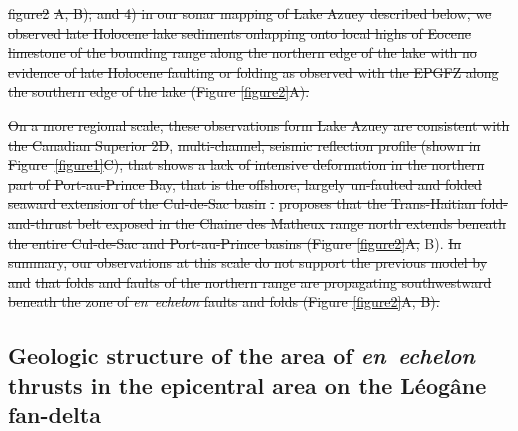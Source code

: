 \documentclass[linenumbers,draft]{agujournal}
\providecommand{\DIFadd}[1]{{\protect\color{blue}\uwave{#1}}} %
\providecommand{\DIFdel}[1]{{\protect\color{red}\sout{#1}}}                      %
\providecommand{\DIFaddbegin}{} %
\providecommand{\DIFaddend}{} %
\providecommand{\DIFdelbegin}{} %
\providecommand{\DIFdelend}{} %
\begin{document}
\DIFdel{figure2}%
\DIFdel{A, B); and 4) in our sonar mapping of Lake Azuey described below, we observed late Holocene lake sediments onlapping onto local highs of Eocene limestone of the bounding range along the northern edge of the lake with no evidence of late Holocene faulting or folding as observed with the EPGFZ along the southern edge of the lake (Figure \ref{figure2}A). 
}%

\DIFdel{On a more regional scale, these observations form Lake Azuey are consistent with the Canadian Superior 2D}\DIFdelend \DIFaddbegin \DIFadd{\ref{figure2}A}\DIFaddend , \DIFdelbegin \DIFdel{multi-channel, seismic reflection profile (shown in Figure~\ref{figure1}C), that shows a lack of intensive deformation in the northern part of Port-au-Prince Bay, that is the offshore, largely un-faulted and folded seaward extension of the Cul-de-Sac basin }%
\DIFdel{. }%
\DIFdel{proposes that the Trans-Haitian fold-and-thrust belt exposed in the Chaine des Matheux range north extends beneath the entire Cul-de-Sac and Port-au-Prince basins (Figure \ref{figure2}A, }\DIFdelend B).
\DIFdelbegin \DIFdel{In summary, our observations at this scale do not support the previous model by }%
\DIFdel{and }%
\DIFdel{that folds and faults of the northern range are propagating southwestward beneath the zone of \textit{en~echelon} faults and folds (Figure \ref{figure2}A, B).
}\DIFdelend 

\subsection{Geologic structure of the area of \textit{en~echelon} thrusts in the epicentral area on the L\'eog\^ane fan-delta}
\end{document}
